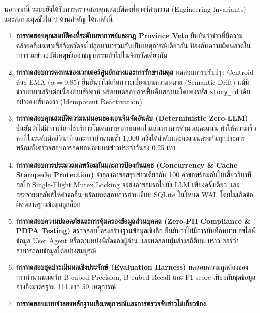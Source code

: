 นอกจากนี้ ระบบยังได้รับการตรวจสอบคุณสมบัติคงที่ทางวิศวกรรม (Engineering Invariants) และสภาวะสุดขั้วใน 9 ด้านสำคัญ ได้แก่ดังนี้
\begin{enumerate}
    \item \textbf{การทดสอบคุณสมบัติคงที่ระดับมหากาพย์และกฎ Province Veto}\newline
    ยืนยันว่าข่าวที่มีความคล้ายคลึงเฉพาะชื่อจังหวัดจะไม่ถูกนำมารวมกันเป็นเหตุการณ์เดียวกัน ป้องกันความผิดพลาดในการรวมข่าวอุบัติเหตุหรืออาชญากรรมทั่วไปในจังหวัดเดียวกัน
    \item \textbf{การทดสอบการคงทนของเวกเตอร์ศูนย์กลางและการรักษาสมดุล}\newline
    ทดสอบการปรับปรุง Centroid ด้วย EMA ($\alpha=0.85$) ยืนยันว่าไม่เกิดภาวะเบี่ยงเบนความหมาย (Semantic Drift) แม้มีข่าวเข้ามาเสริมต่อเนื่องข้ามสัปดาห์ พร้อมทดสอบการฟื้นคืนสถานะโดยคงรหัส \texttt{story\_id} เดิมอย่างคงเส้นคงวา (Idempotent Reactivation)
    \item \textbf{การทดสอบคุณสมบัติความแน่นอนของเอนจินจัดอันดับ (Deterministic Zero-LLM)}\newline
    ยืนยันว่าไม่มีการเรียกใช้บริการโมเดลภาษาภายนอกในเส้นทางการคำนวณคะแนน ทำให้ความเร็วคงที่ในระดับมิลลิวินาที และการคำนวณซ้ำ 1,000 ครั้งได้ลำดับและคะแนนตรงกันทุกประการ พร้อมทั้งตรวจสอบการลดทอนคะแนนข่าวประจำวันลง 0.25 เท่า
    \item \textbf{การทดสอบการประมวลผลพร้อมกันและการป้องกันแคช (Concurrency \& Cache Stampede Protection)}\newline
    จำลองคำขอสรุปข่าวเดียวกัน 100 คำขอพร้อมกันในเสี้ยววินาที กลไก Single-Flight Mutex Locking จะส่งคำขอแรกไปยัง LLM เพียงครั้งเดียว และกระจายผลลัพธ์ให้คำขออื่น พร้อมทดสอบการอ่านเขียน SQLite ในโหมด WAL โดยไม่เกิดข้อผิดพลาดฐานข้อมูลถูกล็อก
    \item \textbf{การทดสอบความปลอดภัยและการคุ้มครองข้อมูลส่วนบุคคล (Zero-PII Compliance \& PDPA Testing)}\newline
    ตรวจสอบโครงสร้างฐานข้อมูลเชิงลึก ยืนยันว่าไม่มีการบันทึกหมายเลขไอพี ข้อมูล User Agent หรือตำแหน่งพิกัดของผู้อ่าน และทดสอบปุ่มล้างสถิติบนเบราว์เซอร์ว่าสามารถลบข้อมูลได้อย่างสมบูรณ์
    \item \textbf{การทดสอบชุดประเมินผลเชิงประจักษ์ (Evaluation Harness)}\newline
    ทดสอบความถูกต้องของการคำนวณเมตริก B-cubed Precision, B-cubed Recall และ F1-score เทียบกับชุดข้อมูลอ้างอิงมาตรฐาน 111 ข่าว 59 เหตุการณ์
    \item \textbf{การทดสอบแบบจำลองหลักฐานเชิงเหตุการณ์และการตรวจจับข่าวไม่เกี่ยวข้อง}\newline

\end{enumerate}
